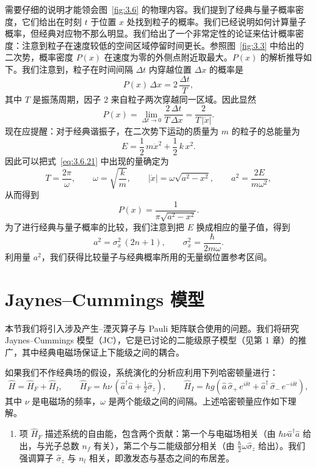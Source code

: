 \medskip
{} 需要仔细的说明才能领会图~\ref{fig:3.6} 的物理内容。我们提到了经典与量子概率密度，它们给出在时刻 $t$ 于位置 $x$ 处找到粒子的概率。我们已经说明如何计算量子概率，但经典对应物不那么明显。我们给出了一个非常定性的论证来估计概率密度：注意到粒子在速度较低的空间区域停留时间更长。参照图~\ref{fig:3.3} 中给出的二次势，概率密度 $P(x)$ 在速度为零的外侧点附近取最大。$P(x)$ 的解析推导如下。我们注意到，粒子在时间间隔 $\Delta t$ 内穿越位置 $\Delta x$ 的概率是
\begin{equation}
P(x)\,\Delta x=2\,\frac{\Delta t}{T},
\label{eq:3.6.23}
\end{equation}
其中 $T$ 是振荡周期，因子 2 来自粒子两次穿越同一区域。因此显然
\begin{equation}
P(x)=\lim_{\Delta t\to0}\frac{2\,\Delta t}{T\,\Delta x}
=\frac{2}{T\,|\dot x|}.
\label{eq:3.6.21}
\end{equation}
现在应提醒：对于经典谐振子，在二次势下运动的质量为 $m$ 的粒子的总能量为
\begin{equation}
E=\frac{1}{2}\,m\dot x^2+\frac{1}{2}\,k\,x^2.
\label{eq:3.6.22}
\end{equation}
因此可以把式~\eqref{eq:3.6.21} 中出现的量确定为
\[
T=\frac{2\pi}{\omega},\qquad \omega=\sqrt{\frac{k}{m}},\qquad
|\dot x|=\omega\sqrt{a^2-x^2},\qquad
a^2=\frac{2E}{m\omega^2},
\]
从而得到
\begin{equation}
P(x)=\frac{1}{\pi\sqrt{a^2-x^2}}.
\label{eq:3.6.24}
\end{equation}
为了进行经典与量子概率的比较，我们注意到把 $E$ 换成相应的量子值，得到
\[
a^2=\sigma_x^2\,(2n+1),\qquad \sigma_x^2=\frac{\hbar}{2m\omega}.
\]
利用量 $a^2$，我们获得比较量子与经典概率所用的无量纲位置参考区间。

\section{Jaynes--Cummings 模型}
\label{sec:3.7}

本节我们将引入涉及产生--湮灭算子与 Pauli 矩阵联合使用的问题。我们将研究 Jaynes--Cummings 模型（JC），它是已讨论的二能级原子模型（见第 1 章）的推广，其中经典电磁场保证上下能级之间的耦合。

如果我们不作经典场的假设，系统演化的分析应利用下列哈密顿量进行：
\begin{equation}
\hat H=\hat H_F+\hat H_I,\qquad
\hat H_F=\hbar\nu\,(\hat a^\dagger\hat a+\tfrac{1}{2}\hat\sigma_z),\qquad
\hat H_I=\hbar g\!\left(\hat a\,\hat\sigma_+\,e^{i\delta t}
+\hat a^\dagger\,\hat\sigma_-\,e^{-i\delta t}\right),
\label{eq:3.7.1}
\end{equation}
其中 $\nu$ 是电磁场的频率，$\omega$ 是两个能级之间的间隔。上述哈密顿量应作如下理解。
\begin{enumerate}
\item[(a)] 项 $\hat H_F$ 描述系统的自由能，包含两个贡献：第一个与电磁场相关（由 $\hbar\nu\hat a^\dagger\hat a$ 给出，与光子总数 $n_f$ 有关），第二个与二能级部分相关（由 $\frac{\hbar}{2}\omega\hat\sigma_z$ 给出）。我们强调算子 $\hat\sigma_z$ 与 $n_l$ 相关，即激发态与基态之间的布居差。
\end{enumerate}

